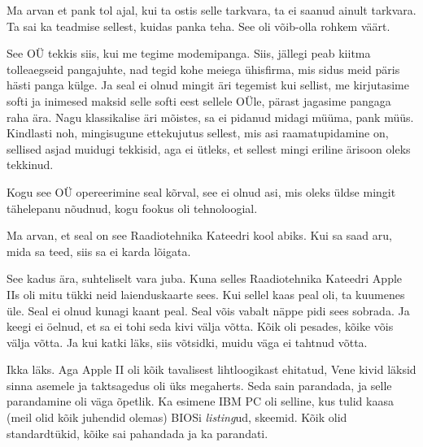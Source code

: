 Ma arvan et pank tol ajal, kui ta ostis selle tarkvara, ta ei saanud ainult tarkvara. Ta sai ka teadmise sellest, kuidas panka teha. See oli võib-olla rohkem väärt.


See OÜ tekkis siis, kui me tegime modemipanga. Siis, jällegi peab kiitma tolleaegseid pangajuhte, nad tegid kohe meiega ühisfirma,  mis sidus meid päris hästi panga külge. Ja seal ei olnud mingit äri tegemist kui sellist, me kirjutasime softi ja inimesed maksid selle softi eest sellele OÜle, pärast jagasime pangaga raha ära. Nagu klassikalise äri mõistes, sa ei pidanud midagi müüma, pank müüs. Kindlasti noh, mingisugune ettekujutus sellest, mis asi raamatupidamine on,  sellised asjad muidugi tekkisid, aga  ei ütleks, et sellest mingi eriline ärisoon oleks tekkinud.

Kogu see OÜ  opereerimine seal kõrval,  see  ei olnud asi, mis oleks üldse mingit tähelepanu nõudnud, kogu fookus oli tehnoloogial.


Ma arvan, et seal on see Raadiotehnika Kateedri kool abiks. Kui sa saad aru, mida sa teed, siis sa ei karda lõigata.


See kadus ära, suhteliselt vara juba. Kuna selles Raadiotehnika Kateedri Apple IIs oli mitu tükki neid laienduskaarte sees. Kui sellel kaas peal oli, ta  kuumenes üle. Seal ei olnud kunagi kaant peal. Seal võis vabalt näppe pidi sees sobrada. Ja keegi  ei öelnud, et sa ei tohi seda kivi välja võtta. Kõik oli pesades, kõike võis välja võtta.  Ja kui katki läks, siis võtsidki, muidu väga ei tahtnud võtta. 


Ikka läks. Aga Apple II oli kõik tavalisest lihtloogikast ehitatud, Vene kivid läksid sinna asemele ja taktsagedus oli üks megaherts. Seda sain parandada, ja selle parandamine oli väga õpetlik. Ka esimene IBM PC oli selline, kus tulid kaasa (meil olid kõik juhendid olemas)  BIOSi \emph{listing}ud, skeemid. Kõik olid standardtükid, kõike sai pahandada ja ka parandati. 

